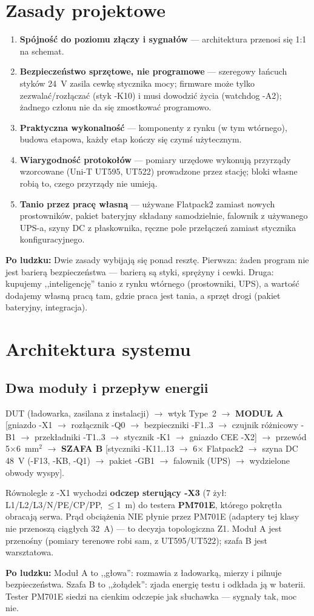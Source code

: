 \documentclass[11pt,a4paper]{article}
\newcommand{\why}[1]{\par\smallskip\noindent\colorbox{blue!6}{\parbox{0.965\linewidth}{\small\textbf{Po ludzku:} #1}}\par\smallskip}
\begin{document}
\section{Zasady projektowe}
\begin{enumerate}
\item \textbf{Spójność do poziomu złączy i sygnałów} --- architektura przenosi się 1:1 na schemat.
\item \textbf{Bezpieczeństwo sprzętowe, nie programowe} --- szeregowy łańcuch styków 24~V zasila
cewkę stycznika mocy; firmware może tylko zezwalać/rozłączać (styk -K10) i musi dowodzić życia
(watchdog -A2); żadnego członu nie da się zmostkować programowo.
\item \textbf{Praktyczna wykonalność} --- komponenty z rynku (w tym wtórnego), budowa etapowa,
każdy etap kończy się czymś użytecznym.
\item \textbf{Wiarygodność protokołów} --- pomiary urzędowe wykonują przyrządy wzorcowane
(Uni-T UT595, UT522) prowadzone przez stację; bloki własne robią to, czego przyrządy nie umieją.
\item \textbf{Tanio przez pracę własną} --- używane Flatpack2 zamiast nowych prostowników, pakiet
bateryjny składany samodzielnie, falownik z używanego UPS-a, szyny DC z płaskownika, ręczne pole
przełączeń zamiast stycznika konfiguracyjnego.
\end{enumerate}
\why{Dwie zasady wybijają się ponad resztę. Pierwsza: żaden program nie jest barierą
bezpieczeństwa --- barierą są styki, sprężyny i cewki. Druga: kupujemy ,,inteligencję'' tanio
z rynku wtórnego (prostowniki, UPS), a wartość dodajemy własną pracą tam, gdzie praca jest tania,
a sprzęt drogi (pakiet bateryjny, integracja).}

\section{Architektura systemu}
\subsection{Dwa moduły i przepływ energii}
\begin{center}\small
DUT (ładowarka, zasilana z instalacji) $\to$ wtyk Type~2 $\to$ \textbf{MODUŁ A} [gniazdo -X1 $\to$
rozłącznik -Q0 $\to$ bezpieczniki -F1..3 $\to$ czujnik różnicowy -B1 $\to$ przekładniki -T1..3 $\to$
stycznik -K1 $\to$ gniazdo CEE -X2] $\to$ przewód 5$\times$6~mm$^2$ $\to$ \textbf{SZAFA B}
[styczniki -K11..13 $\to$ 6$\times$ Flatpack2 $\to$ szyna DC 48~V (-F13, -KB, -Q1) $\to$ pakiet
-GB1 $\to$ falownik (UPS) $\to$ wydzielone obwody wyspy].
\end{center}
Równolegle z -X1 wychodzi \textbf{odczep sterujący -X3} (7 żył: L1/L2/L3/N/PE/CP/PP, $\le$1~m) do
testera \textbf{PM701E}, którego pokrętła obracają serwa. Prąd obciążenia NIE płynie przez PM701E
(adaptery tej klasy nie przenoszą ciągłych 32~A) --- to decyzja topologiczna Z1. Moduł A jest
przenośny (pomiary terenowe robi sam, z UT595/UT522); szafa B jest warsztatowa.
\why{Moduł A to ,,głowa'': rozmawia z ładowarką, mierzy i pilnuje bezpieczeństwa. Szafa B to
,,żołądek'': zjada energię testu i odkłada ją w baterii. Tester PM701E siedzi na cienkim odczepie
jak słuchawka --- sygnały tak, moc nie.}
\end{document}
